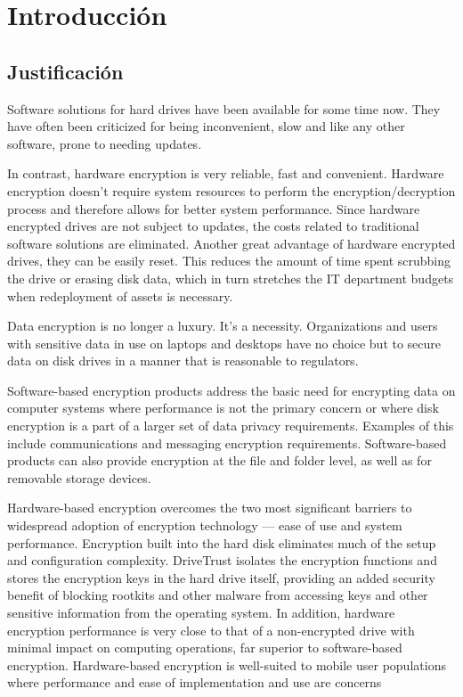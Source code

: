 \chapter{Introducción}

\section{Justificación}
Software solutions for hard drives have been available for some time now. They have often been criticized for being inconvenient, slow and like any other software, prone to needing updates.


In contrast, hardware encryption is very reliable, fast and convenient. Hardware encryption doesn’t require system resources to perform the encryption/decryption process and therefore allows for better system performance. Since hardware encrypted drives are not subject to updates, the costs related to traditional software solutions are eliminated. Another great advantage of hardware encrypted drives, they can be easily reset. This reduces the amount of time spent scrubbing the drive or erasing disk data, which in turn stretches the IT department budgets when redeployment of assets is necessary.


Data encryption is no longer a luxury. It’s a necessity. Organizations and users with sensitive
data in use on laptops and desktops have no choice but to secure data on disk drives in a manner
that is reasonable to regulators.

Software-based encryption products address the basic need for encrypting data on computer
systems where performance is not the primary concern or where disk encryption is a part of a
larger set of data privacy requirements. Examples of this include communications and messaging
encryption requirements. Software-based products can also provide encryption at the file
and folder level, as well as for removable storage devices.

Hardware-based encryption overcomes the two most significant barriers to widespread adoption
of encryption technology — ease of use and system performance. Encryption built into the
hard disk eliminates much of the setup and configuration complexity. DriveTrust isolates the
encryption functions and stores the encryption keys in the hard drive itself, providing an added
security benefit of blocking rootkits and other malware from accessing keys and other sensitive
information from the operating system. In addition, hardware encryption performance is very
close to that of a non-encrypted drive with minimal impact on computing operations, far superior
to software-based encryption. Hardware-based encryption is well-suited to mobile user
populations where performance and ease of implementation and use are concerns

